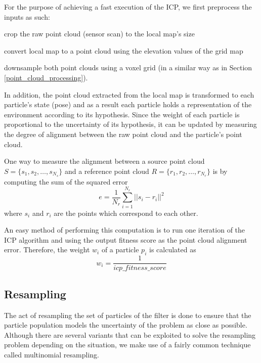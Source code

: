 For the purpose of achieving a fast execution of the ICP,
we first preprocess the inputs as such:
\begin{enumerate*}[label=(\roman*)]
    \item crop the raw point cloud (sensor scan) to the local map's size
    \item convert local map to a point cloud using the elevation values of
        the grid map
    \item downsample both point clouds using a voxel grid (in a similar way
        as in Section \ref{point_cloud_processing}).
\end{enumerate*}

In addition, the point cloud extracted from the local map is transformed to
each particle's state (pose) and as a result each particle holds a
representation of the environment according to its hypothesis.
Since the weight of each particle is proportional to the uncertainty
of its hypothesis, it can be updated by measuring the degree of
alignment between the raw point cloud and the particle's point cloud.

One way to measure the alignment between a source point cloud
$S = \{s_1, s_2, \dots, s_{N_s}\}$ and a reference point cloud
$R = \{r_1, r_2, \dots, r_{N_r}\}$ is by computing the sum of the
squared error
\begin{equation}
    e = \frac{1}{N_r} \sum_{i=1}^{N_r} || s_i - r_i ||^2
\end{equation}
where $s_i$ and $r_i$ are the points which correspond to each other.

An easy method of performing this computation is to run one iteration of
the ICP algorithm and using the output fitness score as the point cloud
alignment error.
Therefore, the weight $w_i$ of a particle $p_i$ is calculated as
\begin{equation}
    w_i = \frac{1}{icp\_fitness\_score}
\end{equation}

\subsection{Resampling}

The act of resampling the set of particles of the filter is done
to ensure that the particle population models the
uncertainty of the problem as close as possible.
Although there are several variants \parencite{Douc2005} that can be
exploited to solve the resampling problem depending on the situation,
we make use of a fairly common technique called multinomial resampling.

